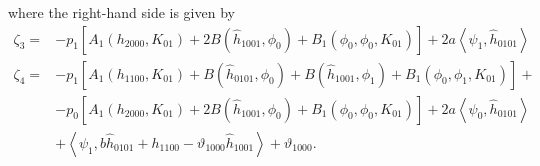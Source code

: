 where the right-hand side is given by
\begin{equation}
    \label{btdde:eq:zeta3_zeta4_tbt}
    \begin{aligned}
        \zeta_3 ={}& -p_1\left[A_1(h_{2000},K_{01}) + 2 B(\hat h_{1001},\phi_0) + B_1(\phi_0,\phi_0,K_{01})\right] + 2a\left< \psi_1, \hat h_{0101} \right>\\
        \zeta_4 ={}& -p_1\left[A_1(h_{1100},K_{01}) + B(\hat h_{0101},\phi_0) + B(\hat h_{1001},\phi_1) + B_1(\phi_0,\phi_1,K_{01})\right] + \\
                   &- p_0 \left[A_1(h_{2000},K_{01}) + 2 B(\hat h_{1001},\phi_0) + B_1(\phi_0,\phi_0,K_{01})\right] + 2 a \left< \psi_0, \hat h_{0101} \right> \\
                                & + \left< \psi_1, b \hat h_{0101} + h_{1100} - \vartheta_{1000} \hat h_{1001} \right> + \vartheta_{1000}. 
    \end{aligned}
\end{equation}

